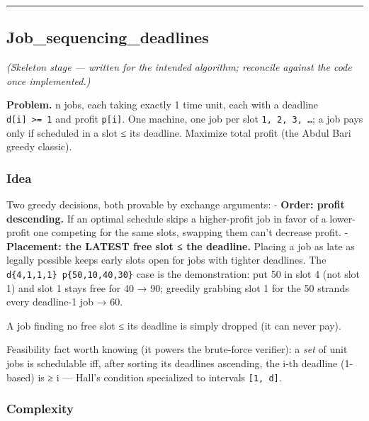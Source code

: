 \documentclass[
  10pt,
  letterpaper,
  onecolumn]{article}
\begin{document}
\begin{center}\rule{0.5\linewidth}{0.5pt}\end{center}

\hypertarget{job_sequencing_deadlines}{%
\subsection{Job\_sequencing\_deadlines}\label{job_sequencing_deadlines}}

\emph{(Skeleton stage --- written for the intended algorithm; reconcile
against the code once implemented.)}

\textbf{Problem.} n jobs, each taking exactly 1 time unit, each with a
deadline \texttt{d{[}i{]}\ \textgreater{}=\ 1} and profit
\texttt{p{[}i{]}}. One machine, one job per slot \texttt{1,\ 2,\ 3,\ …};
a job pays only if scheduled in a slot ≤ its deadline. Maximize total
profit (the Abdul Bari greedy classic).

\hypertarget{idea-16}{%
\subsubsection{Idea}\label{idea-16}}

Two greedy decisions, both provable by exchange arguments: -
\textbf{Order: profit descending.} If an optimal schedule skips a
higher-profit job in favor of a lower-profit one competing for the same
slots, swapping them can't decrease profit. - \textbf{Placement: the
LATEST free slot ≤ the deadline.} Placing a job as late as legally
possible keeps early slots open for jobs with tighter deadlines. The
\texttt{d\{4,1,1,1\}\ p\{50,10,40,30\}} case is the demonstration: put
50 in slot 4 (not slot 1) and slot 1 stays free for 40 → 90; greedily
grabbing slot 1 for the 50 strands every deadline-1 job → 60.

A job finding no free slot ≤ its deadline is simply dropped (it can
never pay).

Feasibility fact worth knowing (it powers the brute-force verifier): a
\emph{set} of unit jobs is schedulable iff, after sorting its deadlines
ascending, the i-th deadline (1-based) is ≥ i --- Hall's condition
specialized to intervals \texttt{{[}1,\ d{]}}.

\hypertarget{complexity-16}{%
\subsubsection{Complexity}\label{complexity-16}}
\end{document}
